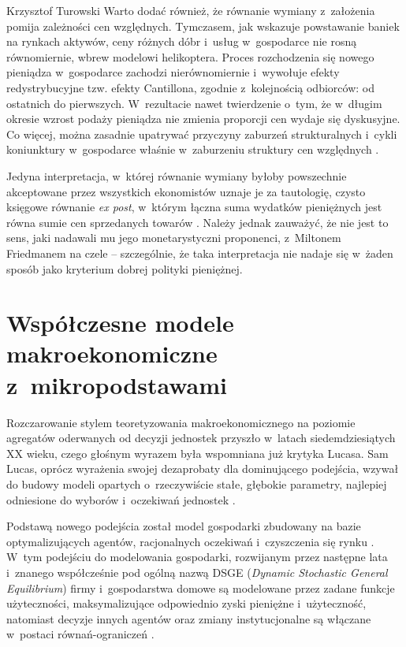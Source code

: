 \begin{artplenv}{Krzysztof Turowski}
Warto dodać również, że równanie wymiany z~założenia pomija zależności cen względnych. Tymczasem, jak wskazuje
powstawanie baniek na rynkach aktywów, ceny różnych dóbr i~usług w~gospodarce nie rosną równomiernie, wbrew modelowi
helikoptera. Proces rozchodzenia się nowego pieniądza w~gospodarce zachodzi nierównomiernie i~wywołuje efekty
redystrybucyjne tzw. efekty Cantillona, zgodnie z~kolejnością odbiorców: od ostatnich do pierwszych. W~rezultacie nawet
twierdzenie o~tym, że w~długim okresie wzrost podaży pieniądza nie zmienia proporcji cen wydaje się dyskusyjne. Co
więcej, można zasadnie upatrywać przyczyny zaburzeń strukturalnych i~cykli koniunktury w~gospodarce
właśnie w~zaburzeniu struktury cen względnych
\parencite{sieron_efekt_2017}.

Jedyna interpretacja, w~której równanie wymiany byłoby powszechnie akceptowane przez wszystkich ekonomistów uznaje je za
tautologię, czysto księgowe równanie \textit{ex post}, w~którym łączna suma wydatków pieniężnych jest równa sumie cen
sprzedanych towarów
\parencite{yeager_tautologies_1994}.
Należy jednak zauważyć, że nie jest to sens, jaki nadawali
mu jego monetarystyczni proponenci, z~Miltonem Friedmanem na czele  --  szczególnie, że taka interpretacja nie
nadaje się w~żaden sposób jako kryterium dobrej polityki pieniężnej.

\section{Współczesne modele makroekonomiczne z~mikropodstawami}
Rozczarowanie stylem teoretyzowania makroekonomicznego na poziomie agregatów oderwanych od decyzji jednostek
przyszło w~latach siedemdziesiątych XX wieku, czego głośnym wyrazem była wspomniana już krytyka Lucasa. Sam Lucas, oprócz
wyrażenia swojej dezaprobaty dla dominującego podejścia, wzywał do budowy modeli opartych o~rzeczywiście stałe,
głębokie parametry, najlepiej odniesione do wyborów i~oczekiwań jednostek
\parencite{lucas_econometric_1976}.

Podstawą nowego podejścia został model gospodarki zbudowany na bazie optymalizujących agentów, racjonalnych
oczekiwań i~czyszczenia się rynku
\parencite{kydland_time_1982}.
W~tym podejściu do modelowania gospodarki,
rozwijanym przez następne lata i~znanego współcześnie pod ogólną nazwą DSGE (\textit{Dynamic Stochastic General
Equilibrium}) firmy i~gospodarstwa domowe są modelowane przez zadane funkcje użyteczności, maksymalizujące odpowiednio
zyski pieniężne i~użyteczność, natomiast decyzje innych agentów oraz zmiany instytucjonalne są włączane w~postaci
równań-ograniczeń
\parencite{woodford_interest_2011,gali_macroeconomic_2007}.



\end{artplenv}
